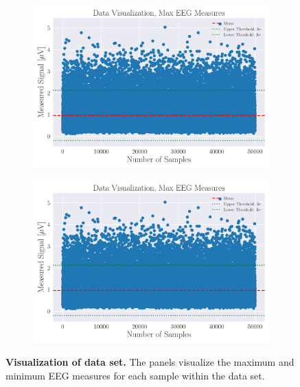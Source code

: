 \documentclass[a4paper, UKenglish, 11pt]{uiomaster}
\begin{document}
\begin{figure}[!htb]
    \centering
    \begin{subfigure}[b]{0.45\linewidth}
        \centering
        \includegraphics[width=\linewidth]{figures/data_visualization_max.pdf}
    \end{subfigure}
    \hfill
    \begin{subfigure}[b]{0.45\linewidth}
        \centering
        \includegraphics[width=\linewidth]{figures/data_visualization_max.pdf}
    \end{subfigure}
    \caption{\textbf{Visualization of data set.} The panels visualize the maximum and minimum EEG measures for each sample within the data set.}
    \label{fig:outliers}
\end{figure}
\end{document}
